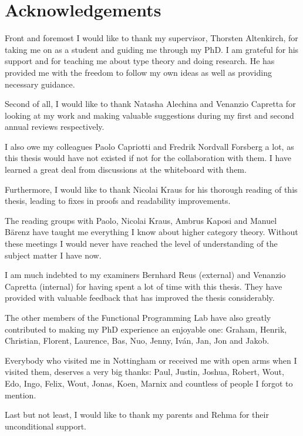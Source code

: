 \chapter*{Acknowledgements}

Front and foremost I would like to thank my supervisor, Thorsten
Altenkirch, for taking me on as a student and guiding me through my
PhD. I am grateful for his support and for teaching me about type
theory and doing research. He has provided me with the freedom to
follow my own ideas as well as providing necessary guidance.

Second of all, I would like to thank Natasha Alechina and Venanzio
Capretta for looking at my work and making valuable suggestions during
my first and second annual reviews respectively.

I also owe my colleagues Paolo Capriotti and Fredrik Nordvall Forsberg
a lot, as this thesis would have not existed if not for the
collaboration with them. I have learned a great deal from discussions
at the whiteboard with them.

Furthermore, I would like to thank Nicolai Kraus for his thorough
reading of this thesis, leading to fixes in proofs and readability
improvements.

The reading groups with Paolo, Nicolai Kraus, Ambrus Kaposi and Manuel
Bärenz have taught me everything I know about higher category
theory. Without these meetings I would never have reached the level of
understanding of the subject matter I have now.

I am much indebted to my examiners Bernhard Reus (external) and
Venanzio Capretta (internal) for having spent a lot of time with this
thesis. They have provided with valuable feedback that has improved
the thesis considerably.

The other members of the Functional Programming Lab have also greatly
contributed to making my PhD experience an enjoyable one: Graham,
Henrik, Christian, Florent, Laurence, Bas, Nuo, Jenny, Iv\'an, Jan,
Jon and Jakob.

Everybody who visited me in Nottingham or received me with open arms
when I visited them, deserves a very big thanks: Paul, Justin, Joshua,
Robert, Wout, Edo, Ingo, Felix, Wout, Jonas, Koen, Marnix and
countless of people I forgot to mention.

Last but not least, I would like to thank my parents and Rehma for
their unconditional support.
